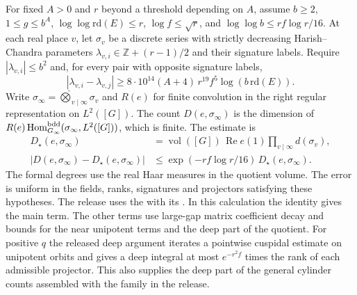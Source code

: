 For fixed \(A>0\) and \(r\) beyond a threshold depending on \(A\),
assume \(b\ge2\), \(1\le g\le b^A\), \(\log\log\mathrm{rd}(E)\le r\),
\(\log f\le\sqrt r\), and \(\log\log b\le rf\log r/16\).
At each real place \(v\), let \(\sigma_v\) be a discrete series with
strictly decreasing Harish--Chandra parameters
\(\lambda_{v,i}\in\mathbb Z+(r-1)/2\) and their signature labels.
Require \(|\lambda_{v,i}|\le b^2\) and, for every pair with opposite
signature labels,
\[
 |\lambda_{v,i}-\lambda_{v,j}|
 \ge 8\cdot10^{14}(A+4)\,r^{19} f^5\log(b\,\mathrm{rd}(E)).
\]
Write \(\sigma_\infty=\widehat\bigotimes_{v\mid\infty}\sigma_v\)
and \(R(e)\) for finite convolution in the right regular
representation on \(L^2([G])\). The count \(D(e,\sigma_\infty)\) is
the dimension of \(R(e)\operatorname{Hom}_{G_\infty}^{\rm bdd}
(\sigma_\infty,L^2([G]))\), which is finite. The estimate is
\[
 \begin{aligned}
 D_\star(e,\sigma_\infty)
    &=\operatorname{vol}([G])\,\operatorname{Re}e(1)
       \prod_{v\mid\infty}d(\sigma_v),\\
 |D(e,\sigma_\infty)-D_\star(e,\sigma_\infty)|
    &\le \exp(-rf\log r/16)\,D_\star(e,\sigma_\infty).
 \end{aligned}
\]
The formal degrees use the real Haar measures in the quotient volume.
The error is uniform in the fields, ranks, signatures and projectors
satisfying these hypotheses. The release uses the
with its
.
In this calculation the identity gives the main term. The other terms
use large-gap matrix coefficient decay and bounds for the near
unipotent terms and the deep part of the quotient.
For positive \(q\) the released deep argument iterates a pointwise
cuspidal estimate on unipotent orbits and gives a deep integral at
most \(e^{-r^2f}\) times the rank of each admissible projector. This
also supplies the deep part of the general cylinder counts assembled
with the family in the release.

